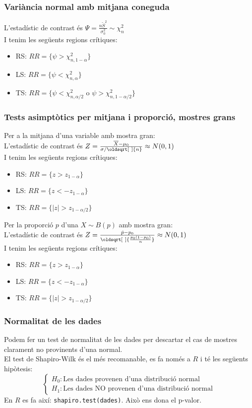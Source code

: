 \documentclass[a4paper]{sciposter}
\renewcommand*{\sqrt}[2][\ ]{\oldsqrt[#1]{#2} }
\begin{document}
\begin{multicols}{3}
\subsubsection{Variància normal amb mitjana coneguda}
L'estadístic de contrast és $\Psi = \frac{n\tilde{S}^2}{\sigma_0^2} \sim \chi^2_n$\\
I tenim les següents regions crítiques:
\begin{itemize}
	\item RS: $RR = \{\psi > \chi^2_{n,1-\alpha}\}$
	\item LS: $RR = \{\psi < \chi^2_{n,\alpha}\}$
	\item TS: $RR = \{\psi < \chi^2_{n,\alpha/2} \text{ o } \psi > \chi^2_{n,1-\alpha/2}\}$
\end{itemize}
\subsubsection{Tests asimptòtics per mitjana i proporció, mostres grans}
Per a la mitjana d'una variable amb mostra gran:\\
L'estadístic de contrast és $Z = \frac{\overline{X} - \mu_0}{\sigma/\sqrt{n}} \approx N(0,1)$\\
I tenim les següents regions crítiques:
\begin{itemize}
	\item RS: $RR = \{z > z_{1-\alpha}\}$
	\item LS: $RR = \{z < -z_{1-\alpha}\}$
	\item TS: $RR = \{|z| > z_{1-\alpha/2}\}$
\end{itemize}
Per la proporció $p$ d'una $X \sim B(p)$ amb mostra gran:\\
L'estadístic de contrast és $Z = \frac{\hat{p} - p_0}{\sqrt{\frac{p_0(1-p_0)}{n}}} \approx N(0,1)$\\
I tenim les següents regions crítiques:
\begin{itemize}
	\item RS: $RR = \{z > z_{1-\alpha}\}$
	\item LS: $RR = \{z < -z_{1-\alpha}\}$
	\item TS: $RR = \{|z| > z_{1-\alpha/2}\}$
\end{itemize}
\subsubsection{Normalitat de les dades}
Podem fer un test de normalitat de les dades per descartar el cas de mostres clarament no provinents d'una normal.\\
El test de Shapiro-Wilk és el més recomanable, es fa només a $R$ i té les següents hipòtesis:
\begin{displaymath}
	\begin{cases}
		H_0: \text{Les dades provenen d'una distribució normal}\\
		H_1: \text{Les dades NO provenen d'una distribució normal}
	\end{cases}
\end{displaymath}
En $R$ es fa així: \texttt{shapiro.test(dades)}. Això ens dona el p-valor.

\end{multicols}
\end{document}
